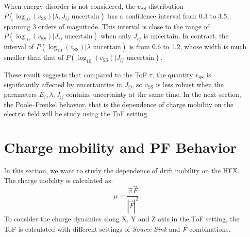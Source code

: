 \documentclass[%
 reprint,
 amsmath,amssymb,
 aps,
]{revtex4-2}
\begin{document}
When energy disorder is not considered, the $v_\text{SS}$ distribution $P(\log_{10}(v_\text{SS})|\lambda, J_{ij} \text{ uncertain})$ has a confidence interval from 0.3 to 3.5, spanning 3 orders of magnitude. This interval is close to the range of $P(\log_{10}(v_\text{SS})|J_{ij} \text{ uncertain})$ when only $J_{ij}$ is uncertain. 
In contrast, the interval of $P(\log_{10}(v_\text{SS})|\lambda \text{ uncertain})$ is from 0.6 to 1.2, whose width is much smaller than that of $P(\log_{10}(v_\text{SS})|J_{ij} \text{ uncertain})$.

These result suggests that compared to the ToF $\tau$, the quantity $v_\text{SS}$ is significantly affected by uncertainties in $J_{ij}$, so $v_\text{SS}$ is less robust when the parameters $E_i, \lambda, J_{ij}$ contains uncertainty at the same time. 
In the next section, the Poole–Frenkel behavior, that is the dependence of charge mobility on the electric field will be study using the ToF setting. 

\section{Charge mobility and PF Behavior}

In this section, we want to study the dependence of drift mobility on the HFX. The charge mobility is calculated as:
\begin{equation}
    \mu = \frac{\vec{v} \vec{F} }{ |\vec{F}|^2}
    \label{eq:mu}
\end{equation}
To consider the charge dynamics along X, Y and Z axis in the ToF setting, the ToF is calculated with different settings of \textit{Source}-\textit{Sink} and $\vec{F}$ combinations.
\end{document}
